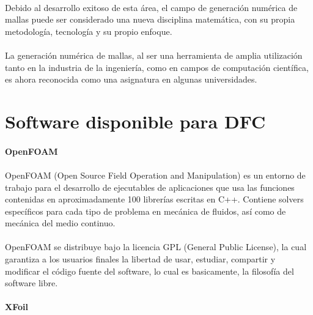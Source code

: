 \documentclass[letterpaper, openright, 12pt]{book}
\begin{document}
    \paragraph*{}
    Debido al desarrollo exitoso de esta área, el campo de generación numérica
    de mallas puede ser considerado una nueva disciplina matemática, con su
    propia metodología, tecnología y su propio enfoque.

    \paragraph*{}
    La generación numérica de mallas, al ser una herramienta de amplia
    utilización tanto en la industria de la ingeniería, como en campos de
    computación científica, es ahora reconocida como una asignatura en algunas
    universidades.\cite{liseikin1999grid}

    \section{Software disponible para DFC}
    \paragraph*{OpenFOAM}
    \paragraph*{}
    OpenFOAM (Open Source Field Operation and Manipulation) es un entorno de
    trabajo para el desarrollo de ejecutables de aplicaciones que usa las
    funciones contenidas en aproximadamente 100 librerías escritas en C++.
    Contiene solvers específicos para cada tipo de problema en mecánica de
    fluidos, así como de mecánica del medio continuo.\cite{openfoam}

    \paragraph*{}
    OpenFOAM se distribuye bajo la licencia GPL (General Public License), la
    cual garantiza a los usuarios finales la libertad de usar, estudiar,
    compartir y modificar el código fuente del software, lo cual es
    basicamente, la filosofía del software libre.

    \paragraph*{XFoil}
\end{document}
